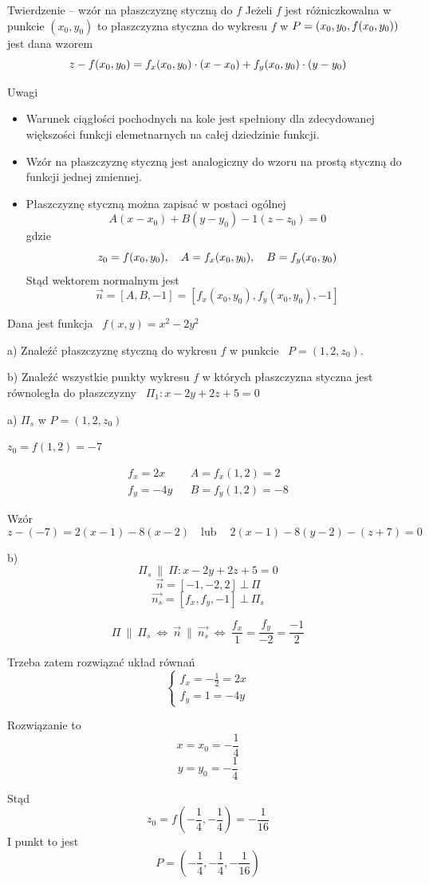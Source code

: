 \begin{tw}{Twierdzenie -- wzór na płaszczyznę styczną do $f$}
    Jeżeli $f$ jest różniczkowalna w punkcie $(x_0, y_0)$ to płaszczyzna styczna do wykresu $f$ w $P = (x_0, y_0, f(x_0, y_0))$ jest dana wzorem
    \[ z - f(x_0, y_0) = f_x(x_0, y_0) \cdot (x - x_0) + f_y(x_0, y_0) \cdot (y - y_0) \]
\end{tw}

Uwagi 
\begin{itemize}
    \item Warunek ciągłości pochodnych na kole jest spełniony dla zdecydowanej większości funkcji elemetnarnych na całej dziedzinie funkcji.
    \item Wzór na płaszczyznę styczną jest analogiczny do wzoru na prostą styczną do funkcji jednej zmiennej.
    \item Płaszczyznę styczną można zapisać w postaci ogólnej
    \[ A(x - x_0) + B(y - y_0) - 1(z - z_0) = 0 \]
    gdzie
    \[ z_0 = f(x_0, y_0), \quad A = f_x(x_0, y_0), \quad B = f_y(x_0, y_0) \]
    Stąd wektorem normalnym jest
    \[ \vec{n} = [A, B, -1] = [f_x(x_0, y_0), f_y(x_0, y_0), -1] \] 
\end{itemize}

\begin{przykladbig}
    Dana jest funkcja \ $ f(x,y) = x^2 - 2y^2 $

    a) Znaleźć płaszczyznę styczną do wykresu $f$ w punkcie \ $ P = (1, 2, z_0) $.

    b) Znaleźć wszystkie punkty wykresu $f$ w których płaszczyzna styczna jest równoległa do płaszczyzny \ $ \Pi_1: x - 2y + 2z + 5 = 0 $
    \bigskip

    a) $ \Pi_s $ w $ P = (1, 2, z_0)$

    $ z_0 = f(1,2) = -7 $

    \[ \begin{array}{lll}
        f_x = 2x && A = f_x(1,2) = 2 \\
        f_y = -4y && B = f_y(1,2) = -8
    \end{array} \]

    Wzór 
    \[ z - (-7) = 2(x-1) - 8(x-2) \quad \text{lub} \quad \ 2(x-1) - 8(y-2) - (z+7) = 0 \]

    b)
    \[ \Pi_s \ \| \ \Pi : x - 2y + 2z + 5 = 0 \]
    \[ \vec{n} = [-1,-2,2] \ \bot \ \Pi \]
    \[ \vec{n_s} = [f_x, f_y, -1] \ \bot \ \Pi_s \]

    \[ \Pi \ \| \ \Pi_s \ \Leftrightarrow \ \vec{n} \ \| \ \vec{n_s} \ \Leftrightarrow \ \frac{f_x}{1} = \frac{f_y}{-2} = \frac{-1}{2} \]

    Trzeba zatem rozwiązać układ równań
    \[ \begin{cases}
        f_x = -\frac{1}{2} = 2x \\
        f_y = 1 = -4y
    \end{cases} \]

    Rozwiązanie to
    \[ x = x_0 = -\frac{1}{4} \]
    \[ y = y_0 = -\frac{1}{4} \]

    Stąd
    \[ z_0 = f\left(-\frac{1}{4}, -\frac{1}{4}\right) = -\frac{1}{16} \]
    I punkt to jest
    \[ P = \left(-\frac{1}{4}, -\frac{1}{4}, -\frac{1}{16}\right) \]
\end{przykladbig}

